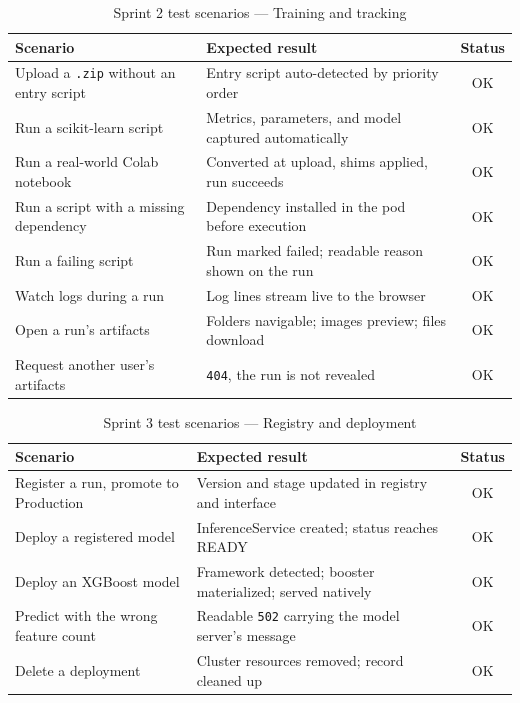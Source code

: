 \begin{table}[H]\centering
\renewcommand{\arraystretch}{1.15}
\caption{Sprint 2 test scenarios --- Training and tracking}\label{tab:tests-s2}
\small
\begin{tabularx}{\textwidth}{|X|X|c|}
\hline
\rowcolor{primary!15}
\textbf{Scenario} & \textbf{Expected result} & \textbf{Status}\\
\hline
Upload a \texttt{.zip} without an entry script & Entry script auto-detected by priority order & OK\\ \hline
Run a scikit-learn script & Metrics, parameters, and model captured automatically & OK\\ \hline
Run a real-world Colab notebook & Converted at upload, shims applied, run succeeds & OK\\ \hline
Run a script with a missing dependency & Dependency installed in the pod before execution & OK\\ \hline
Run a failing script & Run marked failed; readable reason shown on the run & OK\\ \hline
Watch logs during a run & Log lines stream live to the browser & OK\\ \hline
Open a run's artifacts & Folders navigable; images preview; files download & OK\\ \hline
Request another user's artifacts & \texttt{404}, the run is not revealed & OK\\ \hline
\end{tabularx}
\end{table}

\begin{table}[H]\centering
\renewcommand{\arraystretch}{1.15}
\caption{Sprint 3 test scenarios --- Registry and deployment}\label{tab:tests-s3}
\small
\begin{tabularx}{\textwidth}{|X|X|c|}
\hline
\rowcolor{primary!15}
\textbf{Scenario} & \textbf{Expected result} & \textbf{Status}\\
\hline
Register a run, promote to Production & Version and stage updated in registry and interface & OK\\ \hline
Deploy a registered model & InferenceService created; status reaches READY & OK\\ \hline
Deploy an XGBoost model & Framework detected; booster materialized; served natively & OK\\ \hline
Predict with the wrong feature count & Readable \texttt{502} carrying the model server's message & OK\\ \hline
Delete a deployment & Cluster resources removed; record cleaned up & OK\\ \hline
\end{tabularx}
\end{table}

